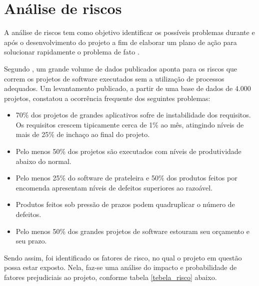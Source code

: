 {\section{Análise de riscos}
	
A análise de riscos tem como objetivo identificar os possíveis problemas durante e após o desenvolvimento do projeto a fim de elaborar um plano de ação para solucionar rapidamente o problema de fato \cite{schmitzanalise}.

Segundo \cite{de2003engenharia}, um grande volume de dados publicados aponta para os riscos que correm os projetos de software executados sem a utilização de processos adequados. Um levantamento publicado, a partir de
uma base de dados de 4.000 projetos, constatou a ocorrência frequente dos seguintes
problemas: 
	
\begin{itemize}
	
	\item 70\% dos projetos de grandes aplicativos sofre de instabilidade dos requisitos. Os requisitos crescem tipicamente cerca de 1\% ao mês, atingindo níveis de mais de 25\% de inchaço ao final
	do projeto.
		
	\item Pelo menos 50\% dos projetos são executados com níveis de produtividade abaixo do normal.
		
	\item Pelo menos 25\% do software de prateleira e 50\% dos produtos feitos por encomenda apresentam níveis de defeitos superiores ao razoável. 
		
	\item Produtos feitos sob pressão de prazos podem quadruplicar o número de defeitos.
		
	\item Pelo menos 50\% dos grandes projetos de software estouram seu orçamento e seu prazo. 
		
	\end{itemize}
	
	
	Sendo assim, foi identificado os fatores de risco, no qual o projeto em questão possa estar exposto. Nela, faz-se uma análise do impacto e probabilidade de fatores prejudiciais ao projeto, conforme tabela \ref{tebela_risco} abaixo.
	
}
